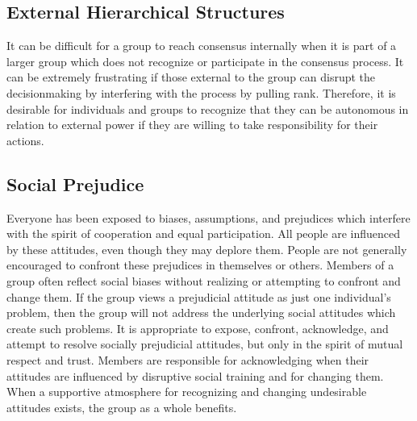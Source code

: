 \subsection*{External Hierarchical Structures}

It can be difficult for a group to reach consensus internally when it is part of a larger group which does not recognize or participate in the consensus process. It can be extremely frustrating if those external to the group can disrupt the decisionmaking by interfering with the process by pulling rank. Therefore, it is desirable for individuals and groups to recognize that they can be autonomous in relation to external power if they are willing to take responsibility for their actions.

\subsection*{Social Prejudice}

Everyone has been exposed to biases, assumptions, and prejudices which interfere with the spirit of cooperation and equal participation. All people are influenced by these attitudes, even though they may deplore them. People are not generally encouraged to confront these prejudices in themselves or others. Members of a group often reflect social biases without realizing or attempting to confront and change them. If the group views a prejudicial attitude as just one individual's problem, then the group will not address the underlying social attitudes which create such problems. It is appropriate to expose, confront, acknowledge, and attempt to resolve socially prejudicial attitudes, but only in the spirit of mutual respect and trust. Members are responsible for acknowledging when their attitudes are influenced by disruptive social training and for changing them. When a supportive atmosphere for recognizing and changing undesirable attitudes exists, the group as a whole benefits.

